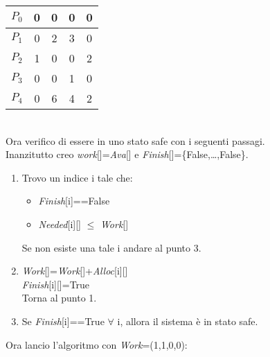 \documentclass{article}
\begin{document}
    \begin{minipage}[c]{0.3\textwidth}
        \centering
        \begin{tabular}{c|cccc}
            $P_0$ & 0 & 0 & 0 & 0\\
            \hline
            $P_1$ & 0 & 2 & 3 & 0\\
            \hline
            $P_2$ & 1 & 0 & 0 & 2\\
            \hline
            $P_3$ & 0 & 0 & 1 & 0\\
            \hline
            $P_4$ & 0 & 6 & 4 & 2\\
        \end{tabular}
    \end{minipage}\\
    Ora verifico di essere in uno stato safe con i seguenti passagi.\\
    Inanzitutto creo \emph{work}[]=\emph{Ava}[] e \emph{Finish}[]=\{False,\dots,False\}.
    \begin{enumerate}
        \item Trovo un indice i tale che:
            \begin{itemize}
                \item \emph{Finish}[i]==False
                \item \emph{Needed}[i][] $\le$ \emph{Work}[]
            \end{itemize}
            Se non esiste una tale i andare al punto 3.
        \item \emph{Work}[]=\emph{Work}[]+\emph{Alloc}[i][]\\
            \emph{Finish}[i][]=True\\
            Torna al punto 1.
        \item Se \emph{Finish}[i]==True $\forall$ i, allora il sistema è in stato safe.
    \end{enumerate}
    Ora lancio l'algoritmo con \emph{Work}=(1,1,0,0):
\end{document}
